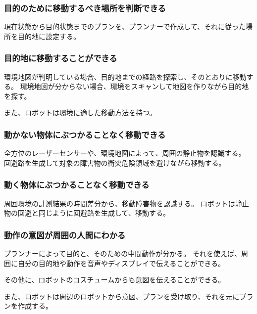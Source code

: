 \documentclass[a4paper,10pt]{jsarticle}
\begin{document}
\subsubsection{目的のために移動するべき場所を判断できる}
現在状態から目的状態までのプランを、プランナーで作成して、それに従った場所を目的地に設定する。

\subsubsection{目的地に移動することができる}
環境地図が判明している場合、目的地までの経路を探索し、そのとおりに移動する。
環境地図が分からない場合、環境をスキャンして地図を作りながら目的地を探す。

また、ロボットは環境に適した移動方法を持つ。

\subsubsection{動かない物体にぶつかることなく移動できる}
全方位のレーザーセンサーや、環境地図によって、周囲の静止物を認識する。
回避路を生成して対象の障害物の衝突危険領域を避けながら移動する。

\subsubsection{動く物体にぶつかることなく移動できる}
周囲環境の計測結果の時間差分から、移動障害物を認識する。
ロボットは静止物の回避と同じように回避路を生成して、移動する。

\subsubsection{動作の意図が周囲の人間にわかる}
プランナーによって目的と、そのための中間動作が分かる。
それを使えば、周囲に自分の目的地や動作を音声やディスプレイで伝えることができる。

その他に、ロボットのコスチュームからも意図を伝えることができる。

また、ロボットは周辺のロボットから意図、プランを受け取り、それを元にプランを作成する。
\end{document}
